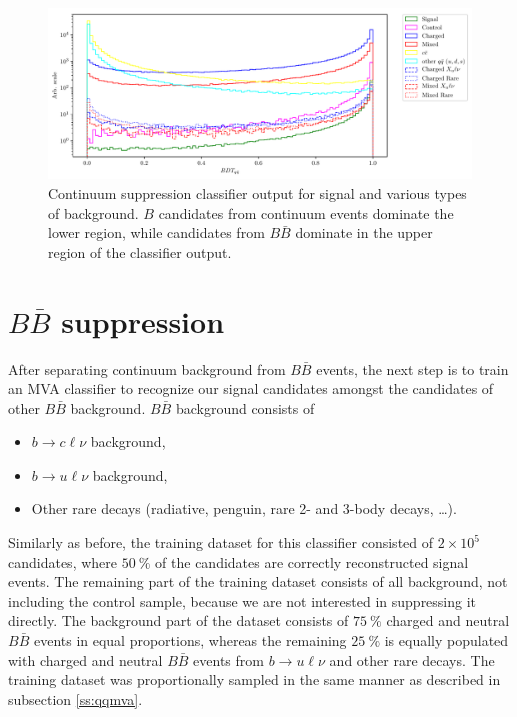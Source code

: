 \documentclass[oneside,a4paper,openany,12pt]{scrbook}
\newcommand {\E}[1]{\times 10^{#1}}
\begin{document}
\begin{figure}[H]
\centering
\captionsetup{width=0.8\linewidth}
\includegraphics[width=\linewidth]{fig/cs_BDT}
\caption{Continuum suppression classifier output for signal and various types of background. $B$ candidates from continuum events dominate the lower region, while candidates from $B\bar B$ dominate in the upper region of the classifier output.}
\label{fig:cs_mva}
\end{figure}

\section{$B\bar B$ suppression}

After separating continuum background from $B \bar B$ events, the next step is to train an MVA classifier to recognize our signal candidates amongst the candidates of other $B \bar B$ background. $B \bar B$ background consists of
\begin{itemize}
\item $b \to c \ell \nu$ background,
\item $b \to u \ell \nu$ background,
\item Other rare decays (radiative, penguin, rare 2- and 3-body decays, \dots).
\end{itemize}

Similarly as before, the training dataset for this classifier consisted of $2\E5$ candidates, where $50~\%$ of the candidates are correctly reconstructed signal events. The remaining part of the training dataset consists of all background, not including the control sample, because we are not interested in suppressing it directly. The background part of the dataset consists of $75~\%$ charged and neutral $B \bar B$ events in equal proportions, whereas the remaining $25~\%$ is equally populated with charged and neutral $B \bar B$ events from $b \to u \ell \nu$ and other rare decays. The training dataset was proportionally sampled in the same manner as described in subsection \ref{ss:qqmva}.
\end{document}
